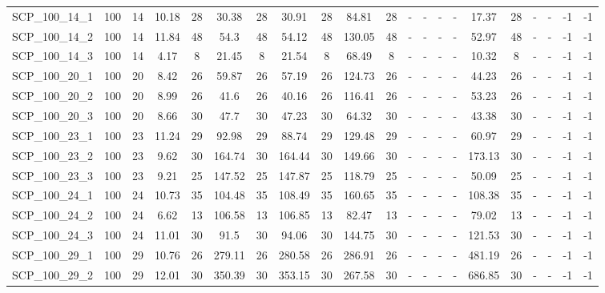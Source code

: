 \begin{sidewaystable}[!ht]
{\begin{tabular}{lcccccccccccccccccccc}
SCP\_100\_14\_1 & 100 & 14 &  \textcolor{blue2}{10.18} & 28 & 30.38 & 28 & 30.91 & 28 & 84.81 & 28 &  - &  - &  - &  - & 17.37 & 28 &  - &  - & -1 & -1 \\
SCP\_100\_14\_2 & 100 & 14 &  \textcolor{blue2}{11.84} & 48 & 54.3 & 48 & 54.12 & 48 & 130.05 & 48 &  - &  - &  - &  - & 52.97 & 48 &  - &  - & -1 & -1 \\
SCP\_100\_14\_3 & 100 & 14 &  \textcolor{blue2}{4.17} & 8 & 21.45 & 8 & 21.54 & 8 & 68.49 & 8 &  - &  - &  - &  - & 10.32 & 8 &  - &  - & -1 & -1 \\
SCP\_100\_20\_1 & 100 & 20 &  \textcolor{blue2}{8.42} & 26 & 59.87 & 26 & 57.19 & 26 & 124.73 & 26 &  - &  - &  - &  - & 44.23 & 26 &  - &  - & -1 & -1 \\
SCP\_100\_20\_2 & 100 & 20 &  \textcolor{blue2}{8.99} & 26 & 41.6 & 26 & 40.16 & 26 & 116.41 & 26 &  - &  - &  - &  - & 53.23 & 26 &  - &  - & -1 & -1 \\
SCP\_100\_20\_3 & 100 & 20 &  \textcolor{blue2}{8.66} & 30 & 47.7 & 30 & 47.23 & 30 & 64.32 & 30 &  - &  - &  - &  - & 43.38 & 30 &  - &  - & -1 & -1 \\
SCP\_100\_23\_1 & 100 & 23 &  \textcolor{blue2}{11.24} & 29 & 92.98 & 29 & 88.74 & 29 & 129.48 & 29 &  - &  - &  - &  - & 60.97 & 29 &  - &  - & -1 & -1 \\
SCP\_100\_23\_2 & 100 & 23 &  \textcolor{blue2}{9.62} & 30 & 164.74 & 30 & 164.44 & 30 & 149.66 & 30 &  - &  - &  - &  - & 173.13 & 30 &  - &  - & -1 & -1 \\
SCP\_100\_23\_3 & 100 & 23 &  \textcolor{blue2}{9.21} & 25 & 147.52 & 25 & 147.87 & 25 & 118.79 & 25 &  - &  - &  - &  - & 50.09 & 25 &  - &  - & -1 & -1 \\
SCP\_100\_24\_1 & 100 & 24 &  \textcolor{blue2}{10.73} & 35 & 104.48 & 35 & 108.49 & 35 & 160.65 & 35 &  - &  - &  - &  - & 108.38 & 35 &  - &  - & -1 & -1 \\
SCP\_100\_24\_2 & 100 & 24 &  \textcolor{blue2}{6.62} & 13 & 106.58 & 13 & 106.85 & 13 & 82.47 & 13 &  - &  - &  - &  - & 79.02 & 13 &  - &  - & -1 & -1 \\
SCP\_100\_24\_3 & 100 & 24 &  \textcolor{blue2}{11.01} & 30 & 91.5 & 30 & 94.06 & 30 & 144.75 & 30 &  - &  - &  - &  - & 121.53 & 30 &  - &  - & -1 & -1 \\
SCP\_100\_29\_1 & 100 & 29 &  \textcolor{blue2}{10.76} & 26 & 279.11 & 26 & 280.58 & 26 & 286.91 & 26 &  - &  - &  - &  - & 481.19 & 26 &  - &  - & -1 & -1 \\
SCP\_100\_29\_2 & 100 & 29 &  \textcolor{blue2}{12.01} & 30 & 350.39 & 30 & 353.15 & 30 & 267.58 & 30 &  - &  - &  - &  - & 686.85 & 30 &  - &  - & -1 & -1 \\

\end{tabular}}
\end{sidewaystable}
